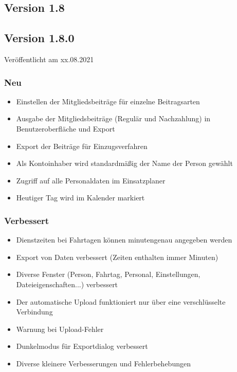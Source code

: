 \begin{neu}
\section{Version 1.8}\label{version:1:8}
\subsection{Version 1.8.0}
\label{version:1:8:0}
Veröffentlicht am xx.08.2021
\subsubsection{Neu}
\begin{itemize}
  \item
  Einstellen der Mitgliedsbeiträge für einzelne Beitragsarten
  \item
  Ausgabe der Mitgliedsbeiträge (Regulär und Nachzahlung) in Benutzeroberfläche und Export
  \item
  Export der Beiträge für Einzugsverfahren
  \item
  Als Kontoinhaber wird standardmäßig der Name der Person gewählt
  \item
  Zugriff auf alle Personaldaten im Einsatzplaner
  \item
  Heutiger Tag wird im Kalender markiert
\end{itemize}

\subsubsection{Verbessert}
\begin{itemize}
  \item
  Dienstzeiten bei Fahrtagen können minutengenau angegeben werden
  \item
  Export von Daten verbessert (Zeiten enthalten immer Minuten)
  \item
  Diverse Fenster (Person, Fahrtag, Personal, Einstellungen, Dateieigenschaften...) verbessert
  \item
  Der automatische Upload funktioniert nur über eine verschlüsselte Verbindung
  \item
  Warnung bei Upload-Fehler
  \item
  Dunkelmodus für Exportdialog verbessert
  \item
  Diverse kleinere Verbesserungen und Fehlerbehebungen

\end{itemize}


\end{neu}
